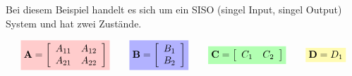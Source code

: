 
\begin{figure}
	\centering
	
\end{figure}

Bei diesem Beispiel handelt es sich um ein SISO (singel Input, singel Output) System und hat zwei Zustände.

\begin{equation*}
	\colorbox{red!20!white}{$
	\mathbf{A} = \left[\begin{array}{cc}
		A_{11} & A_{12}\\
		A_{21} & A_{22}
	\end{array}\right]
	$}
	\qquad
	\colorbox{blue!30!white}{$
	\mathbf{B} = \left[\begin{array}{c}
		B_{1}\\
		B_{2}
	\end{array}\right]
	$}
	\qquad
	\colorbox{green!30!white}{$
	\mathbf{C} = \left[\begin{array}{cc}
		C_{1} & C_{2}
	\end{array}\right]
	$}
	\qquad
	\colorbox{yellow!30!white}{$
	\mathbf{D} = D_1
	$}
\end{equation*}

\begin{figure}[h]
	\centering
	
\end{figure}
